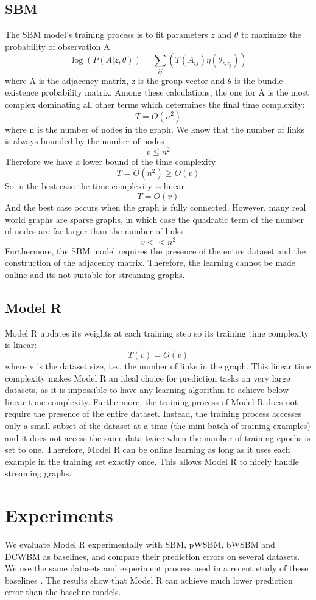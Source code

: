 \documentclass[12pt]{WSUThesis}
\theoremstyle{definition}
\begin{document}
\subsection{SBM}
The SBM model's training process is to fit parameters $ z $ and $ \theta $ to maximize the probability of observation A
\[\log(P(A|z, \theta))= \sum_{ij} (T(A_{ij}) \eta(\theta_{z_i z_j})
)\]
where A is the adjacency matrix, z is the group vector and $ \theta $ is the bundle existence probability matrix.
Among these calculations, the one for A is the most complex dominating all other terms which determines the final time complexity:
\[T = O(n^2)\]
where n is the number of nodes in the graph.
We know that the number of links is always bounded by the number of nodes
\[v \leq n^2\]
Therefore we have a lower bound of the time complexity
\[T = O(n^2) \geq O(v) \]
So in the best case the time complexity is linear
\[ T = O(v) \]
And the best case occurs when the graph is fully connected.
However, many real world graphs are sparse graphs, in which case the quadratic term of the number of nodes are far larger than the number of links
\[v << n^2\]
Furthermore, the SBM model requires the presence of the entire dataset and the construction of the adjacency matrix.
Therefore, the learning cannot be made online and its not suitable for streaming graphs.

\subsection{Model R}
Model R updates its weights at each training step so its training time complexity is linear:
\[T(v) = O(v)\]
where v is the dataset size, i.e., the number of links in the graph.
This linear time complexity makes Model R an ideal choice for prediction tasks on very large datasets, as it is impossible to have any learning algorithm to achieve below linear time complexity.
Furthermore, the training process of Model R does not require the presence of the entire dataset.
Instead, the training process accesses only a small subset of the dataset at a time (the mini batch of training examples) and it does not access the same data twice when the number of training epochs is set to one.
Therefore, Model R can be online learning as long as it uses each example in the training set exactly once.
This allows Model R to nicely handle streaming graphs.

\section{Experiments} \label{section:experiments}
We evaluate Model R experimentally with SBM, pWSBM, bWSBM and DCWBM as baselines,
and compare their prediction errors on several datasets.
We use the same datasets and experiment process used in a recent study of these baselines \cite{aicher2014learning}.
The results show 
that Model R can achieve much lower prediction error than the baseline models.
\end{document}
